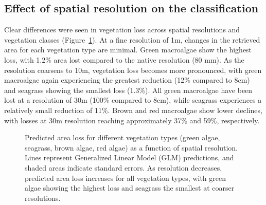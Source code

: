 \documentclass[
  number]{elsarticle}
\begin{document}
\subsection{Effect of spatial resolution on the
classification}\label{effect-of-spatial-resolution-on-the-classification}

Clear differences were seen in vegetation loss across spatial
resolutions and vegetation classes (Figure~\ref{fig-pixelsize}). At a
fine resolution of 1m, changes in the retrieved area for each vegetation
type are minimal. Green macroalgae show the highest loss, with 1.2\%
area lost compared to the native resolution (80 mm). As the resolution
coarsens to 10m, vegetation loss becomes more pronounced, with green
macroalgae again experiencing the greatest reduction (12\% compared to
8cm) and seagrass showing the smallest loss (1.3\%). All green
macroalgae have been lost at a resolution of 30m (100\% compared to
8cm), while seagrass experiences a relatively small reduction of 11\%.
Brown and red macroalgae show lower declines, with losses at 30m
resolution reaching approximately 37\% and 59\%, respectively.

\label{cell-fig-pixelsize}
\begin{figure}[H]


\caption{\label{fig-pixelsize}Predicted area loss for different
vegetation types (green algae, seagrass, brown algae, red algae) as a
function of spatial resolution. Lines represent Generalized Linear Model
(GLM) predictions, and shaded areas indicate standard errors. As
resolution decreases, predicted area loss increases for all vegetation
types, with green algae showing the highest loss and seagrass the
smallest at coarser resolutions.}

\end{figure}%
\end{document}
